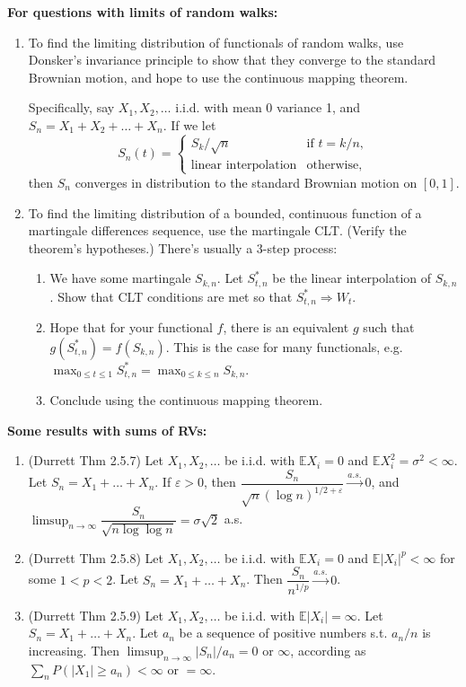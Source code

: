 \documentclass[twoside]{article}
\newcommand{\dis}{\displaystyle}
\newcommand\bbE{\mathbb{E}}
\def\eps{\varepsilon}
\newcommand\sg{\sigma}
\newcommand\goesto{\rightarrow}
\begin{document}
\textbf{For questions with limits of random walks:}
\begin{enumerate}
\item To find the limiting distribution of functionals of random walks, use Donsker's invariance principle to show that they converge to the standard Brownian motion, and hope to use the continuous mapping theorem.

Specifically, say $X_1, X_2, \dots$ i.i.d. with mean 0 variance 1, and $S_n = X_1 + X_2 + \dots + X_n$. If we let
\[ S_n(t) = \begin{cases} S_k / \sqrt{n} &\text{if } t = k/n, \\ \text{linear interpolation} &\text{otherwise,} \end{cases} \]
then $S_n$ converges in distribution to the standard Brownian motion on $[0,1]$.

\item To find the limiting distribution of a bounded, continuous function of a martingale differences sequence, use the martingale CLT. (Verify the theorem's hypotheses.) There's usually a 3-step process:
\begin{enumerate}
\item We have some martingale $S_{k,n}$. Let $S_{t,n}^*$ be the linear interpolation of $S_{k,n}$. Show that CLT conditions are met so that $S_{t,n}^* \Rightarrow W_t$.

\item Hope that for your functional $f$, there is an equivalent $g$ such that $g(S_{t,n}^*) = f(S_{k,n})$. This is the case for many functionals, e.g. $\max_{0 \leq t \leq 1} S_{t,n}^* = \max_{0 \leq k \leq n} S_{k,n}$.

\item Conclude using the continuous mapping theorem.
\end{enumerate}

\end{enumerate}

\textbf{Some results with sums of RVs:}
\begin{enumerate}
\item (Durrett Thm 2.5.7) Let $X_1, X_2, \dots$ be i.i.d. with $\bbE X_i = 0$ and $\bbE X_i^2 = \sg^2 < \infty$. Let $S_n = X_1 + \dots + X_n$. If $\eps > 0$, then $\dfrac{S_n}{\sqrt{n} (\log n)^{1/2 + \eps}} \stackrel{a.s.}{\goesto} 0$, and $\dis\limsup_{n \goesto \infty} \dfrac{S_n}{\sqrt{n \log \log n}} = \sg \sqrt{2}$ a.s.

\item (Durrett Thm 2.5.8) Let $X_1, X_2, \dots$ be i.i.d. with $\bbE X_i = 0$ and $\bbE |X_i|^p < \infty$ for some $1 < p < 2$. Let $S_n = X_1 + \dots + X_n$. Then $\dfrac{S_n}{n^{1/p}} \stackrel{a.s.}{\goesto} 0$.

\item (Durrett Thm 2.5.9) Let $X_1, X_2, \dots$ be i.i.d. with $\bbE |X_i| = \infty$. Let $S_n = X_1 + \dots + X_n$. Let $a_n$ be a sequence of positive numbers s.t. $a_n/n$ is increasing. Then $\dis\limsup_{n \goesto \infty} |S_n|/a_n =0$ or $\infty$, according as $\dis\sum_n P(|X_1| \geq a_n) < \infty$ or $= \infty$.
\end{enumerate}
\end{document}
